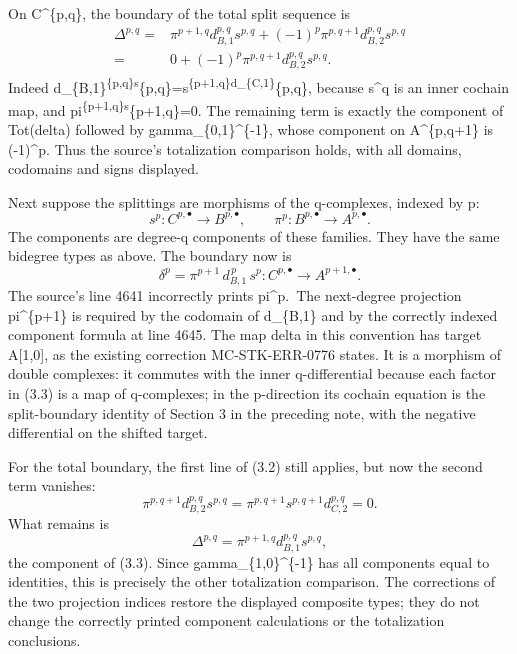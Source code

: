 \documentclass[11pt]{article}
\begin{document}
On C\^{}\{p,q\}, the boundary of the total split sequence is \[
\begin{aligned}
\Delta^{p,q}
={}&\pi^{p+1,q}d_{B,1}^{p,q}s^{p,q}
 +(-1)^p\pi^{p,q+1}d_{B,2}^{p,q}s^{p,q}\\
={}&0+(-1)^p\pi^{p,q+1}d_{B,2}^{p,q}s^{p,q}.
\end{aligned}                                               \tag{3.2}
\] Indeed d\_\{B,1\}\textsuperscript{\{p,q\}s}\{p,q\}=s\textsuperscript{\{p+1,q\}d\_\{C,1\}}\{p,q\}, because s\^{}q is an inner cochain map, and pi\textsuperscript{\{p+1,q\}s}\{p+1,q\}=0. The remaining term is exactly the component of Tot(delta) followed by gamma\_\{0,1\}\^{}\{-1\}, whose component on A\^{}\{p,q+1\} is (-1)\^{}p. Thus the source's totalization comparison holds, with all domains, codomains and signs displayed.

Next suppose the splittings are morphisms of the q-complexes, indexed by p: \[
s^p:C^{p,\bullet}\longrightarrow B^{p,\bullet},\qquad
\pi^p:B^{p,\bullet}\longrightarrow A^{p,\bullet}.
\] The components are degree-q components of these families. They have the same bidegree types as above. The boundary now is \[
\boxed{\quad
\delta^p=\pi^{p+1}\,d_{B,1}^{\,p}\,s^p:
C^{p,\bullet}\longrightarrow A^{p+1,\bullet}.
\quad}                                                     \tag{3.3}
\] The source's line 4641 incorrectly prints pi\^{}p.~The next-degree projection pi\^{}\{p+1\} is required by the codomain of d\_\{B,1\} and by the correctly indexed component formula at line 4645. The map delta in this convention has target A{[}1,0{]}, as the existing correction MC-STK-ERR-0776 states. It is a morphism of double complexes: it commutes with the inner q-differential because each factor in (3.3) is a map of q-complexes; in the p-direction its cochain equation is the split-boundary identity of Section 3 in the preceding note, with the negative differential on the shifted target.

For the total boundary, the first line of (3.2) still applies, but now the second term vanishes: \[
\pi^{p,q+1}d_{B,2}^{p,q}s^{p,q}
=\pi^{p,q+1}s^{p,q+1}d_{C,2}^{p,q}=0.
\] What remains is \[
\Delta^{p,q}=\pi^{p+1,q}d_{B,1}^{p,q}s^{p,q},
\] the component of (3.3). Since gamma\_\{1,0\}\^{}\{-1\} has all components equal to identities, this is precisely the other totalization comparison. The corrections of the two projection indices restore the displayed composite types; they do not change the correctly printed component calculations or the totalization conclusions.
\end{document}
